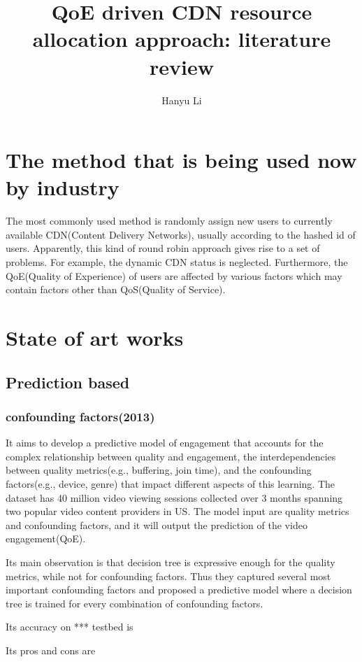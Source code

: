 \documentclass{ctexart}
\title{QoE driven CDN resource allocation approach: literature review}
\author{Hanyu Li}
\begin{document}
\maketitle
\section{The method that is being used now by industry}
The most commonly used method is randomly assign new users to currently available CDN(Content Delivery Networks), usually according to the hashed id of users. Apparently, this kind of round robin approach gives rise to a set of problems. For example, the dynamic CDN status is neglected. Furthermore, the QoE(Quality of Experience) of users are affected by various factors which may contain factors other than QoS(Quality of Service).
\section{State of art works}
\subsection{Prediction based}
\subsubsection{confounding factors(2013)\cite{DBLP:conf/sigcomm/BalachandranSASSZ13}}
\par It aims to develop a predictive model of engagement that accounts for the complex relationship between quality and engagement, the interdependencies between quality metrics(e.g., buffering, join time), and the confounding factors(e.g., device, genre) that impact different aspects of this learning. The dataset has 40 million video viewing sessions collected over 3 months spanning two popular video content providers in US. The model input are quality metrics and confounding factors, and it will output the prediction of the video engagement(QoE).
\par Its main observation is that decision tree is expressive enough for the quality metrics, while not for confounding factors. Thus they captured several most important confounding factors and proposed a predictive model where a decision tree is trained for every combination of confounding factors. 
\par Its accuracy on *** testbed is 
\par Its pros and cons are
\end{document}
